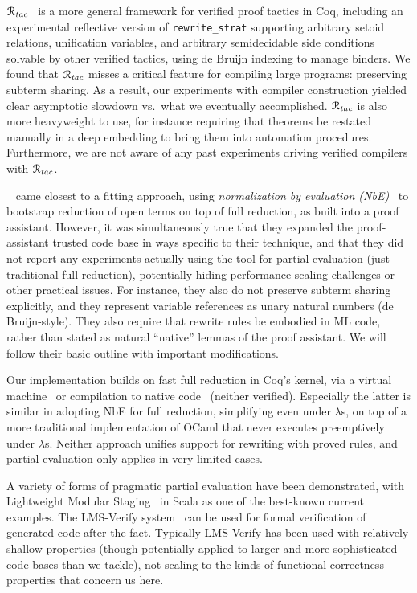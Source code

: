 \documentclass[a4paper,USenglish,cleveref,autoref,thm-restate]{lipics-v2021}
\newcommand{\citet}[1]{\usebibentry{#1}{citet}~\cite{#1}}
\newcommand{\Rtac}{\ensuremath{\mathcal{R}_\text{\emph{tac}}}}
\begin{document}
\Rtac{}~\cite{rtac} is a more general framework for verified proof tactics in Coq, including an experimental reflective version of \texttt{rewrite\_strat} supporting arbitrary setoid relations, unification variables, and arbitrary semidecidable side conditions solvable by other verified tactics, using de Bruijn indexing to manage binders.
We found that \Rtac{} misses a critical feature for compiling large programs: preserving subterm sharing.
As a result, our experiments with compiler construction yielded clear asymptotic slowdown vs.\ what we eventually accomplished.
\Rtac{} is also more heavyweight to use, for instance requiring that theorems be restated manually in a deep embedding to bring them into automation procedures.
Furthermore, we are not aware of any past experiments driving verified compilers with \Rtac{}.

\citet{Aehlig} came closest to a fitting approach, using \emph{normalization by evaluation (NbE)}~\cite{NbE} to bootstrap reduction of open terms on top of full reduction, as built into a proof assistant.
However, it was simultaneously true that they expanded the proof-assistant trusted code base in ways specific to their technique, and that they did not report any experiments actually using the tool for partial evaluation (just traditional full reduction), potentially hiding performance-scaling challenges or other practical issues.
For instance, they also do not preserve subterm sharing explicitly, and they represent variable references as unary natural numbers (de Bruijn-style).
They also require that rewrite rules be embodied in ML code, rather than stated as natural ``native'' lemmas of the proof assistant.
We will follow their basic outline with important modifications.

Our implementation builds on fast full reduction in Coq's kernel, via a virtual machine~\cite{vmcompute} or compilation to native code~\cite{nativecompute} (neither verified).
Especially the latter is similar in adopting NbE for full reduction, simplifying even under $\lambda$s, on top of a more traditional implementation of OCaml that never executes preemptively under $\lambda$s.
Neither approach unifies support for rewriting with proved rules, and partial evaluation only applies in very limited cases.

A variety of forms of pragmatic partial evaluation have been demonstrated, with Lightweight Modular Staging~\cite{LMS} in Scala as one of the best-known current examples.
The LMS-Verify system~\cite{LMSVerify} can be used for formal verification of generated code after-the-fact.
Typically LMS-Verify has been used with relatively shallow properties (though potentially applied to larger and more sophisticated code bases than we tackle), not scaling to the kinds of functional-correctness properties that concern us here.
\end{document}
